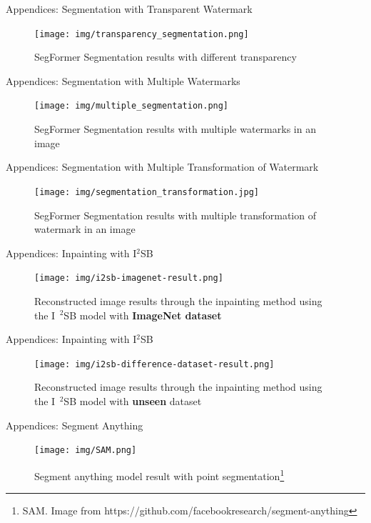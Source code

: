 \begin{frame}{Appendices: Segmentation with Transparent Watermark}
\begin{figure}[t]
    \centering
    \texttt{[image: img/transparency\_segmentation.png]}
    \caption{SegFormer Segmentation results with different transparency}
    \label{fig:wtm-with-white-detail}   
\end{figure}
\end{frame}

\begin{frame}{Appendices: Segmentation with Multiple Watermarks}
\begin{figure}[t]
    \centering
    \texttt{[image: img/multiple\_segmentation.png]}
    \caption{SegFormer Segmentation results with multiple watermarks in an image}
    \label{fig:wtm-with-white-detail}   
\end{figure}
\end{frame}


\begin{frame}{Appendices: Segmentation with Multiple Transformation of Watermark}
\begin{figure}[t]
    \centering
    \texttt{[image: img/segmentation\_transformation.jpg]}
    \caption{SegFormer Segmentation results with multiple transformation of watermark in an image}
    \label{fig:wtm-with-white-detail}   
\end{figure}
\end{frame}

\begin{frame}{Appendices: Inpainting with I$^2$SB}
\begin{figure}
    \centering
    \texttt{[image: img/i2sb-imagenet-result.png]}
    \caption{Reconstructed image results through the inpainting method using the I$^{\text{ }2}$SB model with \textbf{ImageNet dataset}}
\end{figure}
\end{frame}

\begin{frame}{Appendices: Inpainting with I$^2$SB}
\begin{figure}
    \centering
    \texttt{[image: img/i2sb-difference-dataset-result.png]}
    \caption{Reconstructed image results through the inpainting method using the I$^{\text{ }2}$SB model with \textbf{unseen} dataset}
\end{figure}
\end{frame}



\begin{frame}{Appendices: Segment Anything}
    \begin{figure}
        \centering
        \texttt{[image: img/SAM.png]}
        \caption{Segment anything model result with point segmentation\footnote[1]{\scriptsize SAM. Image from https://github.com/facebookresearch/segment-anything}}
        \label{fig:enter-label}
    \end{figure}
\end{frame}
